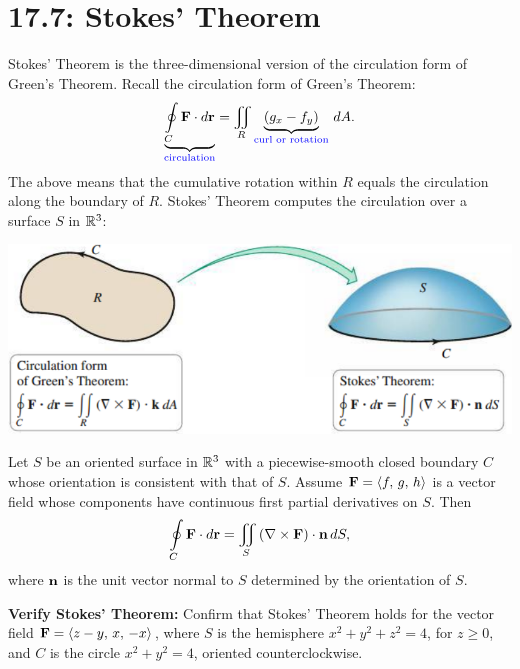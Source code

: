 \documentclass[../mathNotesPreamble]{subfiles}
\begin{document}
\section{17.7: Stokes' Theorem}

  Stokes' Theorem is the three-dimensional version of the circulation form of Green's Theorem. Recall the circulation form of Green's Theorem:
    \[\underbrace{\oint\limits_C \mathbf F\cdot d{\mathbf{r}}}_{\textcolor{blue}{\textnormal{circulation}}}=\iint\limits_R \underbrace{(g_x-f_y)}_{\textcolor{blue}{\textnormal{curl or rotation}}}\,dA.\]
  The above means that the cumulative rotation within $R$ equals the circulation along the boundary of $R$. Stokes' Theorem computes the circulation over a surface $S$ in $\mathbb{R}^3$:
  
  \begin{center}
    \includegraphics[width=0.75\linewidth]{../images/briggs_17_07/fig17_59}
  \end{center}

  \begin{thmBox*}
    Let $S$ be an oriented surface in $\mathbb{R}^3$ with a piecewise-smooth closed boundary $C$ whose orientation is consistent with that of $S$. Assume $\mathbf F={\left\langle f,\,g,\,h \right\rangle}$ is a vector field whose components have continuous first partial derivatives on $S$. Then
      \[\oint\limits_C \mathbf F\cdot d{\mathbf{r}}=\iint\limits_S {\left(\nabla\times\mathbf F\right)}\cdot{\mathbf{n}}\,dS,\]
    where ${\mathbf{n}}$ is the unit vector normal to $S$ determined by the orientation of $S$.
  \end{thmBox*}
  \pagebreak

  \begin{ex*}
    \textbf{Verify Stokes' Theorem:} Confirm that Stokes' Theorem holds for the vector field $\mathbf F={\left\langle z-y,\,x,\,-x \right\rangle}$, where $S$ is the hemisphere $x^2+y^2+z^2=4$, for $z\geq 0$, and $C$ is the circle $x^2+y^2=4$, oriented counterclockwise.
  \end{ex*}
  \pagebreak
\end{document}
